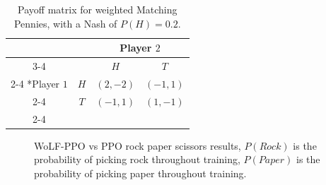 \documentclass[conference]{IEEEtran}
\begin{document}
\begin{table}[!ht]
    \centering
    \setlength{\extrarowheight}{2pt}
    \begin{tabular}{*{4}{c|}}
      \multicolumn{2}{c}{} & \multicolumn{2}{c}{Player $2$}\\\cline{3-4}
      \multicolumn{1}{c}{} &  & $H$  & $T$ \\\cline{2-4}
      \multirow{2}*{Player $1$}  & $H$ & $(2,-2)$ & $(-1,1)$ \\\cline{2-4}
      & $T$ & $(-1,1)$ & $(1,-1)$ \\\cline{2-4}
    \end{tabular}
    \caption{Payoff matrix for weighted Matching Pennies, with a Nash of $P(H)=0.2$.}
    \label{tab:weighted-mp}
\end{table}

\begin{figure}[htbp]
    \caption{WoLF-PPO vs PPO rock paper scissors results, $P(Rock)$ is the probability of picking rock throughout training, $P(Paper)$ is the probability of picking paper throughout training.}
\end{figure}
\end{document}
